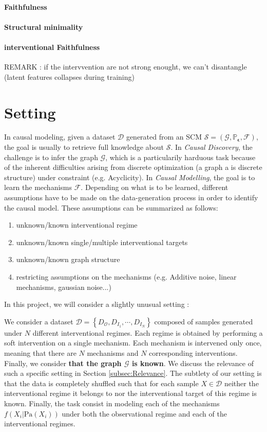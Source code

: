 \documentclass{article}
\begin{document}
\paragraph{Faithfulness}

\paragraph{Structural minimality}

\paragraph{interventional Faithfulness}
REMARK : if the intervvention are not strong enought, we can't disantangle (latent features collapses during training)
\section{Setting}\label{subsec:setting}

In causal modeling, given a dataset $\mathcal{D}$ generated from an SCM $\mathcal{S}= (\mathcal{G}, \mathbb{P}_{\boldsymbol{\epsilon}}, \mathcal{F})$, the goal is usually to retrieve full knowledge about $\mathcal{S}$. In \textit{Causal Discovery}, the challenge is to infer the graph $\mathcal{G}$, which is a particularily harduous task because of the inherent difficulties arising from discrete optimization (a graph a is discrete structure) under constraint (e.g. Acyclicity). In \textit{Causal Modelling}, the goal is to learn the mechanisms $\mathcal{F}$. Depending on what is to be learned, different assumptions have to be made on the data-generation process in order to identify the causal model. These assumptions can be summarized as follows:
\begin{enumerate}
    \item unknown/known interventional regime
    \item unknown/known single/multiple interventional targets
    \item unknown/known graph structure
    \item restricting assumptions on the mechanisms (e.g. Additive noise, linear mechanisms, gaussian noise...)
\end{enumerate}

In this project, we will consider a slightly unusual setting :

We consider a dataset $\mathcal{D} = \left\{ D_{\mathcal{O}},D_{I_1}, \cdots, D_{I_N} \right\}$ composed of samples generated under $N$ different interventional regimes. Each regime is obtained by performing a soft intervention on a single mechanism. Each mechanism is intervened only once, meaning that there are $N$ mechanisms and $N$ corresponding interventions. Finally, we consider \textbf{that the graph $\mathcal{G}$ is known}. We discuss the relevance of such a specific setting in Section \ref{subsec:Relevance}.
 The subtlety of our setting is that the data is completely shuffled such that for each sample $X \in \mathcal{D}$ neither the interventional regime it belongs to nor the interventional target of this regime is known. Finally, the task consist in modeling each of the mechanisms $f(X_i | \text{Pa}(X_i))$ under both the observational regime and each of the interventional regimes.
\end{document}
